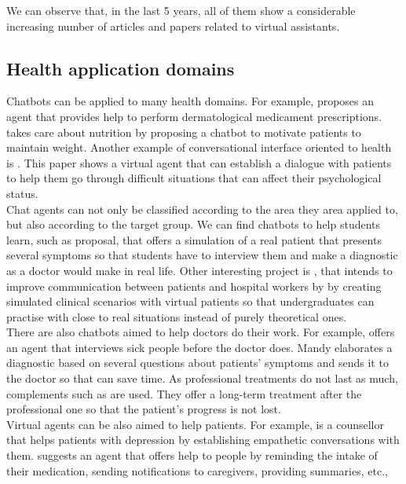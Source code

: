 \documentclass[12pt,english]{article}
\begin{document}
We can observe that, in the last 5 years, all of them show a considerable increasing number of articles and papers related to virtual assistants.


\subsection{Health application domains}

Chatbots can be applied to many health domains. For example, \cite{Alesanco2017185} proposes an agent that provides help to perform dermatological medicament prescriptions. \cite{BennetPraba20193470} takes care about nutrition by proposing a chatbot to motivate patients to maintain weight. Another example of conversational interface oriented to health is \cite{Falala-Sechet2019236}. This paper shows a virtual agent that can establish a dialogue with patients to help them go through difficult situations that can affect their psychological status.\\

Chat agents can not only be classified according to the area they area applied to, but also according to the target group. We can find chatbots to help students learn, such as \cite{Lopez2008194} proposal, that offers a simulation of a real patient that presents several symptoms so that students have to interview them and make a diagnostic as a doctor would make in real life. Other interesting project is \cite{Shorey2019e14658}, that intends to improve communication between patients and hospital workers by by creating simulated clinical scenarios with virtual patients so that undergraduates can practise with close to real situations instead of purely theoretical ones.\\

There are also chatbots aimed to help doctors do their work. For example, \cite{Ni201738} offers an agent that interviews sick people before the doctor does. Mandy elaborates a diagnostic based on several questions about patients' symptoms and sends it to the doctor so that can save time. As professional treatments do not last as much, complements such as \cite{DAlfonso2017} are used. They offer a long-term treatment after the professional one so that the patient's progress is not lost. \\

Virtual agents can be also aimed to help patients. For example, \cite{Harilal2020349} is a counsellor that helps patients with depression by establishing empathetic conversations with them. \cite{Roca2020954} suggests an agent that offers help to people by reminding the intake of their medication, sending notifications to caregivers, providing summaries, etc.,
\end{document}
